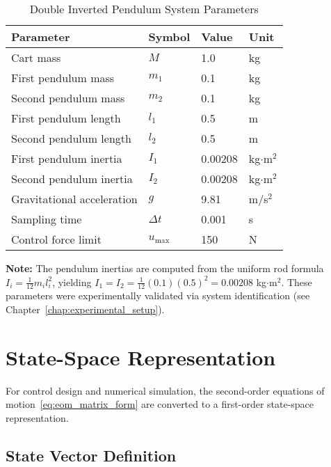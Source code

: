 \begin{table}[htbp]
\centering
\caption{Double Inverted Pendulum System Parameters}
\label{tab:system_parameters}
\begin{tabular}{llll}
\toprule
\textbf{Parameter} & \textbf{Symbol} & \textbf{Value} & \textbf{Unit} \\
\midrule
Cart mass & $M$ & 1.0 & kg \\
First pendulum mass & $m_1$ & 0.1 & kg \\
Second pendulum mass & $m_2$ & 0.1 & kg \\
First pendulum length & $l_1$ & 0.5 & m \\
Second pendulum length & $l_2$ & 0.5 & m \\
First pendulum inertia & $I_1$ & 0.00208 & kg$\cdot$m$^2$ \\
Second pendulum inertia & $I_2$ & 0.00208 & kg$\cdot$m$^2$ \\
Gravitational acceleration & $g$ & 9.81 & m/s$^2$ \\
Sampling time & $\Delta t$ & 0.001 & s \\
Control force limit & $u_{\max}$ & 150 & N \\
\bottomrule
\end{tabular}
\end{table}

\textbf{Note:} The pendulum inertias are computed from the uniform rod formula $I_i = \frac{1}{12}m_i l_i^2$, yielding $I_1 = I_2 = \frac{1}{12}(0.1)(0.5)^2 = 0.00208$ kg$\cdot$m$^2$. These parameters were experimentally validated via system identification (see Chapter~\ref{chap:experimental_setup}).

\section{State-Space Representation}
\label{sec:state_space}

For control design and numerical simulation, the second-order equations of motion~\eqref{eq:eom_matrix_form} are converted to a first-order state-space representation.

\subsection{State Vector Definition}

